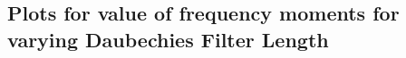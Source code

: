 \documentclass{article}
\begin{document}
\subsection{Plots for value of frequency moments for varying Daubechies Filter Length}

\begin{figure}[H]
    \centering
    \qquad
    \label{fig:example}%
\end{figure}

\begin{figure}[H]
    \centering
    \qquad
    \label{fig:example}%
\end{figure}
\end{document}

